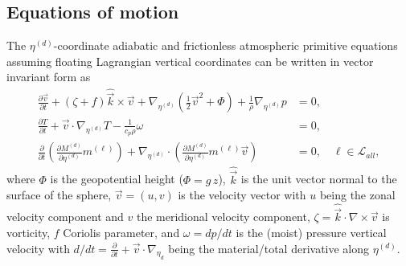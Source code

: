 \documentclass{agujournal}
\begin{document}
{\subsection{Equations of motion}\label{eq:eqnsmotion}
The $\eta^{(d)}$-coordinate adiabatic and frictionless atmospheric primitive equations assuming floating Lagrangian vertical coordinates \citep{S1945JAS,L2004MWR} can be written in vector invariant form as
\begin{align}
\frac{\partial \vec{v}}{\partial t} + \left( \zeta + f \right) {\hat{\vec{k}}} \times \vec{v}  + \nabla_{\eta^{(d)}} \left( \frac12 \vec{v}^2 + \Phi \right)  + \frac{1}{\rho} \nabla_{\eta^{(d)}} p &= 0,\label{E:PEmom} \\
\frac{\partial T}{\partial t} + \vec{v} \cdot \nabla_{\eta^{(d)}} T  -  \frac{1}{c_p \rho} \omega  &= 0, \label{E:PEtemp} \\
\frac{\partial}{\partial t} \left( \frac{\partial M^{(d)}}{\partial \eta^{(d)}} m^{(\ell)} \right) +  \nabla_{\eta^{(d)}}\cdot   \left( \frac{\partial M^{(d)}}{\partial \eta^{(d)}} m^{(\ell)} \vec{v} \right)  &= 0, \quad \ell \in \mathcal{L}_{all}, \label{E:PEq}
\end{align}
where $\Phi$ is the geopotential height ($\Phi=g\, z$), ${\hat{\vec{k}}}$ is the unit vector normal to the surface of the sphere, $\vec{v}=(u,v)$ is the velocity vector with $u$ being the zonal velocity component and $v$ the meridional velocity component, $\zeta = {\hat{\vec{k}}} \cdot {\nabla \times} \vec{v}$ is vorticity, $f$ Coriolis parameter, and $\omega = dp/dt$ is the (moist) pressure vertical velocity with $d/dt=\frac{\partial }{\partial t}+\vec{v}\cdot \nabla_{\eta_d}$ being the material/total derivative along $\eta^{(d)}$. 

}
\end{document}
